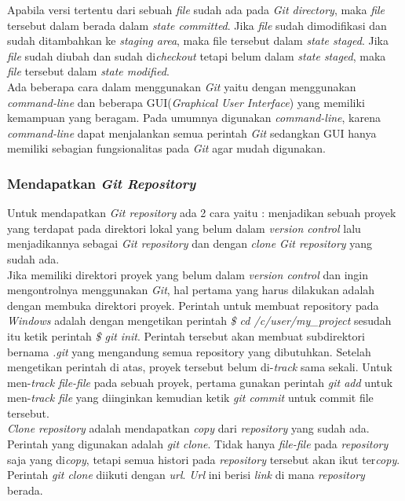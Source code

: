 Apabila versi tertentu dari sebuah \textit{file} sudah ada pada \textit{Git directory}, maka \textit{file} tersebut dalam berada dalam \textit{state committed}. Jika \textit{file} sudah dimodifikasi dan sudah ditambahkan ke \textit{staging area}, maka file tersebut dalam \textit{state staged}. Jika \textit{file} sudah diubah dan sudah di\textit{checkout} tetapi belum dalam \textit{state staged}, maka \textit{file} tersebut dalam \textit{state modified}.\\

Ada beberapa cara dalam menggunakan \textit{Git} yaitu dengan menggunakan \textit{command-line} dan beberapa GUI(\textit{Graphical User Interface}) yang memiliki kemampuan yang beragam. Pada umumnya digunakan \textit{command-line}, karena \textit{command-line} dapat menjalankan semua perintah \textit{Git} sedangkan GUI hanya memiliki sebagian fungsionalitas pada \textit{Git} agar mudah digunakan. 

\subsubsection{Mendapatkan \textit{Git Repository}}
Untuk mendapatkan \textit{Git repository} ada 2 cara yaitu : menjadikan sebuah proyek yang terdapat pada direktori lokal yang belum dalam \textit{version control} lalu menjadikannya sebagai \textit{Git repository} dan dengan \textit{clone Git repository} yang sudah ada.\\

Jika memiliki direktori proyek yang belum dalam \textit{version control} dan ingin mengontrolnya menggunakan \textit{Git}, hal pertama yang harus dilakukan adalah dengan membuka direktori proyek. Perintah untuk membuat repository pada \textit{Windows} adalah dengan mengetikan perintah \textit{\$ cd /c/user/my\_project} sesudah itu ketik perintah \textit{\$ git init}. Perintah tersebut akan membuat subdirektori bernama \textit{.git} yang mengandung semua repository yang dibutuhkan. Setelah mengetikan perintah di atas, proyek tersebut belum di-\textit{track} sama sekali. Untuk men-\textit{track file-file} pada sebuah proyek, pertama gunakan perintah \textit{git add} untuk men-\textit{track file} yang diinginkan kemudian ketik \textit{git commit} untuk commit file tersebut.\\

\textit{Clone repository} adalah mendapatkan \textit{copy} dari \textit{repository} yang sudah ada. Perintah yang digunakan adalah \textit{git clone}. Tidak hanya \textit{file-file} pada \textit{repository} saja yang di\textit{copy}, tetapi semua histori pada \textit{repository} tersebut akan ikut ter\textit{copy}. Perintah \textit{git clone} diikuti dengan \textit{url}. \textit{Url} ini berisi \textit{link} di mana \textit{repository} berada.

